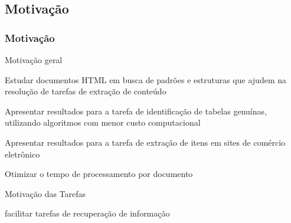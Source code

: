 \documentclass{beamer}
\newenvironment{my_itemize}{
\begin{itemize}
  \setlength{\itemsep}{5pt}
  \setlength{\parskip}{2pt}
  \setlength{\parsep}{3pt}
}{\end{itemize}}
\begin{document}
\begin{frame}[allowframebreaks]
  \subsection{Motivação}
  \frametitle{Motivação}
  \begin{my_itemize}
   \item Motivação geral
 
  \begin{my_itemize}
    \item Estudar documentos HTML em busca de padrões e estruturas que ajudem na resolução de tarefas de extração de conteúdo

    \item Apresentar resultados para a tarefa de identificação de tabelas genuínas, utilizando algoritmos com menor custo computacional

    \item Apresentar resultados para a tarefa de extração de itens em sites de comércio eletrônico

    \item Otimizar o tempo de processamento por documento
  \end{my_itemize}

   \item Motivação das Tarefas

   \begin{my_itemize}
    \item facilitar tarefas de recuperação de informação
   \end{my_itemize}

\end{my_itemize} 
\end{frame}
\end{document}
